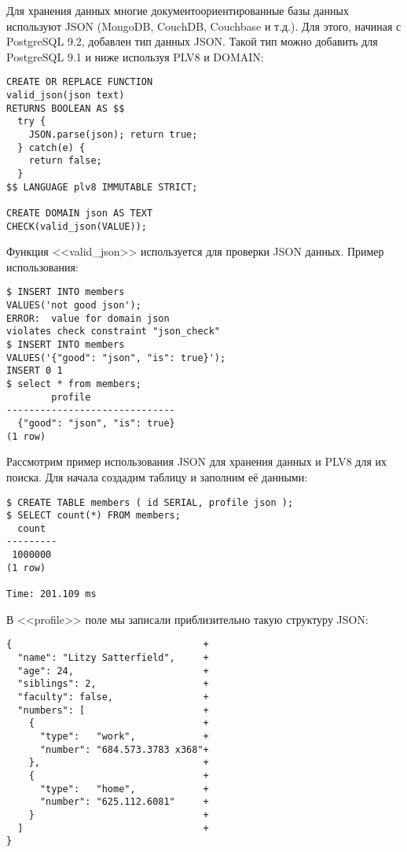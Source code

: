 Для хранения данных многие документоориентированные базы данных используют JSON (MongoDB, CouchDB, Couchbase и т.д.). Для этого, начиная с PostgreSQL 9.2, добавлен тип данных JSON. Такой тип можно добавить для PostgreSQL 9.1 и ниже используя PLV8 и DOMAIN:

\begin{lstlisting}[label=lst:plv8js7,caption=Создание типа JSON]
CREATE OR REPLACE FUNCTION 
valid_json(json text)
RETURNS BOOLEAN AS $$
  try { 
    JSON.parse(json); return true; 
  } catch(e) { 
    return false;
  }
$$ LANGUAGE plv8 IMMUTABLE STRICT;

CREATE DOMAIN json AS TEXT 
CHECK(valid_json(VALUE));
\end{lstlisting}

Функция <<valid\_json>> используется для проверки JSON данных. Пример использования:

\begin{lstlisting}[label=lst:plv8js8,caption=Проверка JSON]
$ INSERT INTO members 
VALUES('not good json');
ERROR:  value for domain json 
violates check constraint "json_check"
$ INSERT INTO members 
VALUES('{"good": "json", "is": true}');
INSERT 0 1
$ select * from members;
	    profile            
------------------------------
  {"good": "json", "is": true}
(1 row)
\end{lstlisting}

Рассмотрим пример использования JSON для хранения данных и PLV8 для их поиска. Для начала создадим таблицу и заполним её данными:

\begin{lstlisting}[label=lst:plv8js9,caption=Таблица с JSON полем]
$ CREATE TABLE members ( id SERIAL, profile json );
$ SELECT count(*) FROM members;
  count  
---------
 1000000
(1 row)

Time: 201.109 ms
\end{lstlisting}

В <<profile>> поле мы записали приблизительно такую структуру JSON:

\begin{lstlisting}[label=lst:plv8js10,caption=JSON структура]
{                                  +
  "name": "Litzy Satterfield",     +
  "age": 24,                       +
  "siblings": 2,                   +
  "faculty": false,                +
  "numbers": [                     +
    {                              +
      "type":   "work",            +
      "number": "684.573.3783 x368"+
    },                             +
    {                              +
      "type":   "home",            +
      "number": "625.112.6081"     +
    }                              +
  ]                                +
}
\end{lstlisting}

